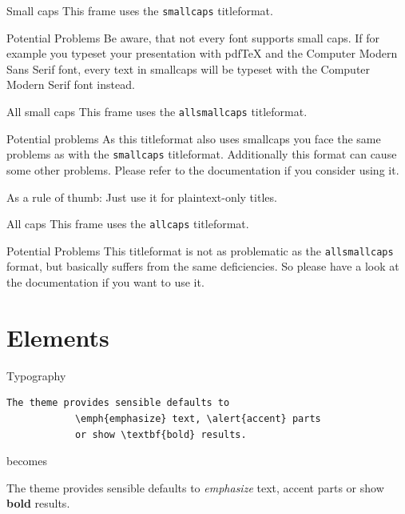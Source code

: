 \documentclass[10pt]{beamer}
\begin{document}
	{
		\begin{frame}{Small caps}
			This frame uses the \texttt{smallcaps} titleformat.
			
			\begin{alertblock}{Potential Problems}
				Be aware, that not every font supports small caps. If for example you typeset your presentation with pdfTeX and the Computer Modern Sans Serif font, every text in smallcaps will be typeset with the Computer Modern Serif font instead.
			\end{alertblock}
		\end{frame}
	}
	
	{
		\begin{frame}{All small caps}
			This frame uses the \texttt{allsmallcaps} titleformat.
			
			\begin{alertblock}{Potential problems}
				As this titleformat also uses smallcaps you face the same problems as with the \texttt{smallcaps} titleformat. Additionally this format can cause some other problems. Please refer to the documentation if you consider using it.
				
				As a rule of thumb: Just use it for plaintext-only titles.
			\end{alertblock}
		\end{frame}
	}
	
	{
		\begin{frame}{All caps}
			This frame uses the \texttt{allcaps} titleformat.
			
			\begin{alertblock}{Potential Problems}
				This titleformat is not as problematic as the \texttt{allsmallcaps} format, but basically suffers from the same deficiencies. So please have a look at the documentation if you want to use it.
			\end{alertblock}
		\end{frame}
	}
	
	\section{Elements}
	
	\begin{frame}[fragile]{Typography}
		\begin{verbatim}The theme provides sensible defaults to
			\emph{emphasize} text, \alert{accent} parts
			or show \textbf{bold} results.\end{verbatim}
		
		\begin{center}becomes\end{center}
		
		The theme provides sensible defaults to \emph{emphasize} text,
		\alert{accent} parts or show \textbf{bold} results.
	\end{frame}
	
\end{document}
